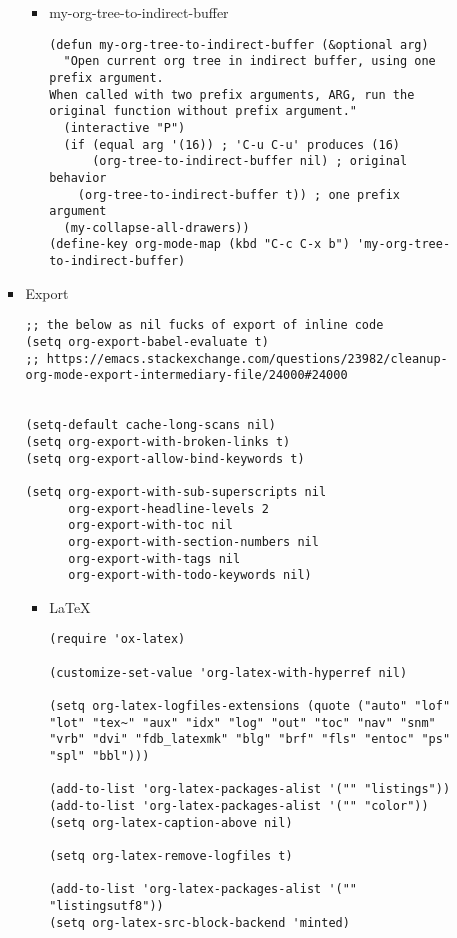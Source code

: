 \documentclass{article}
\begin{document}
\begin{itemize}
\begin{itemize}
\begin{itemize}
\begin{itemize}
\item my-org-tree-to-indirect-buffer
\label{sec:orgbdbb1b0}
\begin{verbatim}
(defun my-org-tree-to-indirect-buffer (&optional arg)
  "Open current org tree in indirect buffer, using one prefix argument.
When called with two prefix arguments, ARG, run the original function without prefix argument."
  (interactive "P")
  (if (equal arg '(16)) ; 'C-u C-u' produces (16)
      (org-tree-to-indirect-buffer nil) ; original behavior
    (org-tree-to-indirect-buffer t)) ; one prefix argument
  (my-collapse-all-drawers))
(define-key org-mode-map (kbd "C-c C-x b") 'my-org-tree-to-indirect-buffer)

\end{verbatim}
\end{itemize}

\item Export
\label{sec:org8ae295c}
\begin{verbatim}
;; the below as nil fucks of export of inline code
(setq org-export-babel-evaluate t)
;; https://emacs.stackexchange.com/questions/23982/cleanup-org-mode-export-intermediary-file/24000#24000


(setq-default cache-long-scans nil)
(setq org-export-with-broken-links t)
(setq org-export-allow-bind-keywords t)

(setq org-export-with-sub-superscripts nil
      org-export-headline-levels 2
      org-export-with-toc nil
      org-export-with-section-numbers nil
      org-export-with-tags nil
      org-export-with-todo-keywords nil)
\end{verbatim}
\begin{itemize}
\item \LaTeX{}
\label{sec:orgc3700fd}
\begin{verbatim}
(require 'ox-latex)

(customize-set-value 'org-latex-with-hyperref nil) 

(setq org-latex-logfiles-extensions (quote ("auto" "lof" "lot" "tex~" "aux" "idx" "log" "out" "toc" "nav" "snm" "vrb" "dvi" "fdb_latexmk" "blg" "brf" "fls" "entoc" "ps" "spl" "bbl")))

(add-to-list 'org-latex-packages-alist '("" "listings"))
(add-to-list 'org-latex-packages-alist '("" "color"))
(setq org-latex-caption-above nil)

(setq org-latex-remove-logfiles t)

(add-to-list 'org-latex-packages-alist '("" "listingsutf8"))
(setq org-latex-src-block-backend 'minted)


\end{verbatim}
\end{itemize}
\end{itemize}
\end{itemize}
\end{itemize}
\end{document}
